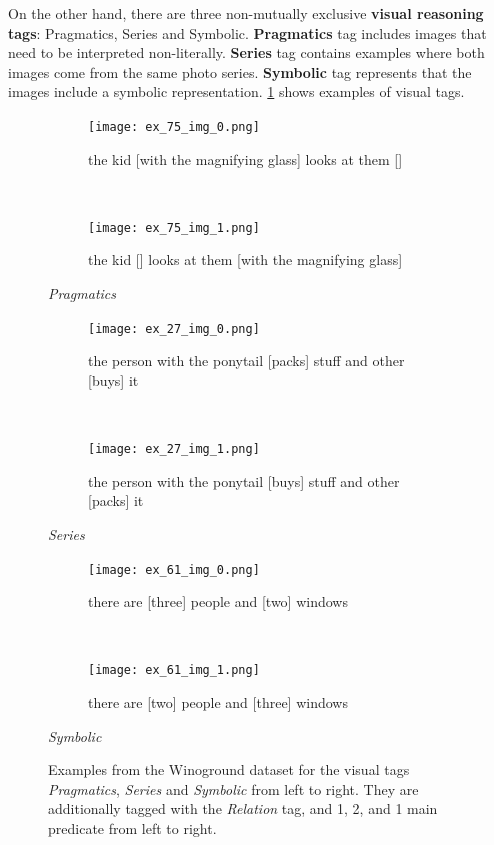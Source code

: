 On the other hand, there are three non-mutually exclusive \textbf{visual reasoning tags}: Pragmatics, Series and Symbolic. \textbf{Pragmatics} tag includes images that need to be interpreted non-literally. \textbf{Series} tag contains examples where both images come from the same photo series. \textbf{Symbolic} tag represents that the images include a symbolic representation. \cref{fig:winoground-examples-visual} shows examples of visual tags.

\begin{figure}[ht]
\centering
    \begin{minipage}{.30\textwidth}
        \begin{subfigure}{\textwidth}
        \centering
        \texttt{[image: ex\_75\_img\_0.png]}
        \caption{the kid [with the magnifying glass] looks at them []}
        \end{subfigure}\\
        \begin{subfigure}{\textwidth}
        \centering
        \texttt{[image: ex\_75\_img\_1.png]}
        \caption{the kid [] looks at them [with the magnifying glass]}
        \end{subfigure}%
        \caption*{\textit{Pragmatics}}
    \end{minipage}
    \hfill
    \begin{minipage}{.30\textwidth}
        \begin{subfigure}{\textwidth}
        \centering
        \texttt{[image: ex\_27\_img\_0.png]}
        \caption{the person with the ponytail [packs] stuff and other [buys] it}
        \end{subfigure}\\
        \begin{subfigure}{\textwidth}
        \centering
        \texttt{[image: ex\_27\_img\_1.png]}
        \caption{the person with the ponytail [buys] stuff and other [packs] it}
        \end{subfigure}%
        \caption*{\textit{Series}}
    \end{minipage}
    \hfill
    \begin{minipage}{.30\textwidth}
        \begin{subfigure}{\textwidth}
        \centering
        \texttt{[image: ex\_61\_img\_0.png]}
        \caption{there are [three] people and [two] windows}
        \end{subfigure}\\
        \begin{subfigure}{\textwidth}
        \centering
        \texttt{[image: ex\_61\_img\_1.png]}
        \caption{there are [two] people and [three] windows}
        \end{subfigure}%
        \caption*{\textit{Symbolic}}
    \end{minipage}
    \caption{Examples from the Winoground dataset for the visual tags \textit{Pragmatics}, \textit{Series} and \textit{Symbolic} from left to right. They are additionally tagged with the \textit{Relation} tag, and 1, 2, and 1 main predicate from left to right.}
    \label{fig:winoground-examples-visual}
\end{figure}


